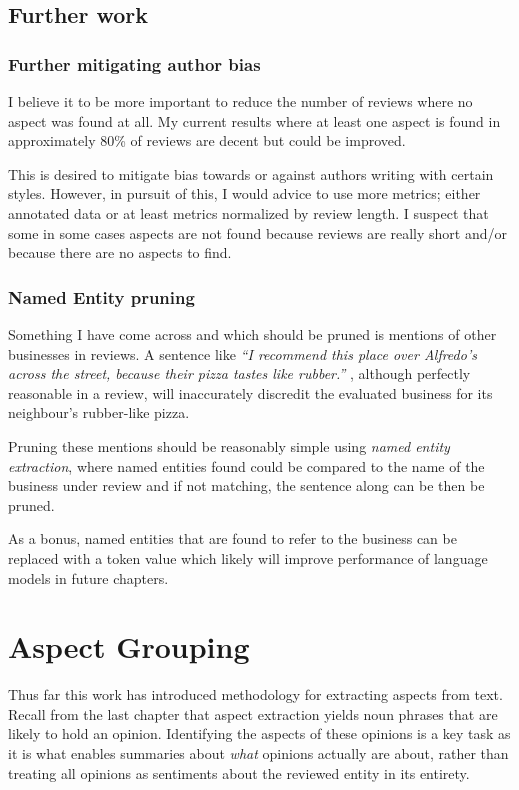 \documentclass[a4paper,11pt]{kth-mag}
\begin{document}
\section{Further work}
\subsection{Further mitigating author bias}
I believe it to be more important to reduce the number of reviews where no aspect was
found at all. My current results where at least one aspect is found in approximately
80\% of reviews are decent but could be improved.

This is desired to mitigate bias towards or against authors writing with certain styles.
However, in pursuit of this, I would advice to use more metrics; either annotated data
or at least metrics normalized by review length. I suspect that some in some cases
aspects are not found because reviews are really short and/or because there are no aspects
to find.

\subsection{Named Entity pruning}

Something I have come across and which should be pruned is mentions of other businesses
in reviews. A sentence like
\emph{``I recommend this place over Alfredo's across the street, because their pizza tastes like rubber.''}
, although perfectly reasonable in a review, will inaccurately discredit
the evaluated business for its neighbour's rubber-like pizza.

Pruning these mentions should be reasonably simple using \emph{named entity extraction}, where named
entities found could be compared to the name of the business under review and if not matching,
the sentence along can be then be pruned.

As a bonus, named entities that are found to refer to the business can be replaced
with a token value which likely will improve performance of language models in future chapters.




\chapter{Aspect Grouping}
Thus far this work has introduced methodology for extracting aspects from text.
Recall from the last chapter that aspect extraction yields noun phrases that are likely
to hold an opinion.
Identifying the aspects of these opinions is a key task as it is what enables
summaries about \emph{what} opinions actually are about, rather than treating all opinions
as sentiments about the reviewed entity in its entirety.
\end{document}
